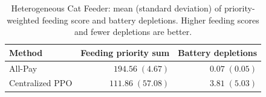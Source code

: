 \begin{table}[t]
  \caption{Heterogeneous Cat Feeder: mean (standard deviation) of priority-weighted feeding score and battery depletions. Higher feeding scores and fewer depletions are better.}
  \label{tab:heterogeneous-cat-feeder}
  \centering
  \begin{tabular}{lrr}
    \toprule
    Method & Feeding priority sum & Battery depletions \\
    \midrule
    All-Pay & $194.56\;(4.67)$ & $0.07\;(0.05)$ \\
    Centralized PPO & $111.86\;(57.08)$ & $3.81\;(5.03)$ \\
    \bottomrule
  \end{tabular}
\end{table}
